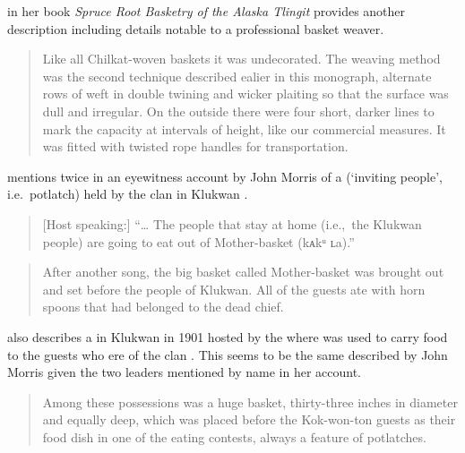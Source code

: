\citeauthor{paul:1944} in her book \textit{Spruce Root Basketry of the Alaska Tlingit} provides another description including details notable to a professional basket weaver.

\begin{quote}\small
Like all Chilkat-woven baskets it was undecorated.
The weaving method was the second technique described ealier in this monograph, alternate rows of weft in double twining and wicker plaiting so that the surface was dull and irregular.
On the outside there were four short, darker lines to mark the capacity at intervals of height, like our commercial measures.
It was fitted with twisted rope handles for transportation.
\end{quote}

\citeauthor{swanton:1908} mentions  twice in an eyewitness account by  John Morris of a  (‘inviting people’, i.e.\ potlatch) held by the  clan in Klukwan \parencite[438–442]{swanton:1908}.

\begin{quote}\small
[Host speaking:] “… The people that stay at home (i.e.,\ the Klukwan people) are going to eat out of Mother-basket (kᴀkᵘ ʟa).”
\end{quote}

\begin{quote}\small
After another song, the big basket called Mother-basket was brought out and set before the people of Klukwan. All of the guests ate with horn spoons that had belonged to the dead chief.
\end{quote}

\citeauthor{paul:1944} also describes a  in Klukwan in 1901 hosted by the  where  was used to carry food to the guests who ere of the  clan \parencite[69]{paul:1944}.
This seems to be the same  described by  John Morris given the two  leaders mentioned by name in her account.

\begin{quote}\small
Among these possessions was a huge basket, thirty-three inches in diameter and equally deep, which was placed before the Kok-won-ton guests as their food dish in one of the eating contests, always a feature of potlatches.
\end{quote}

